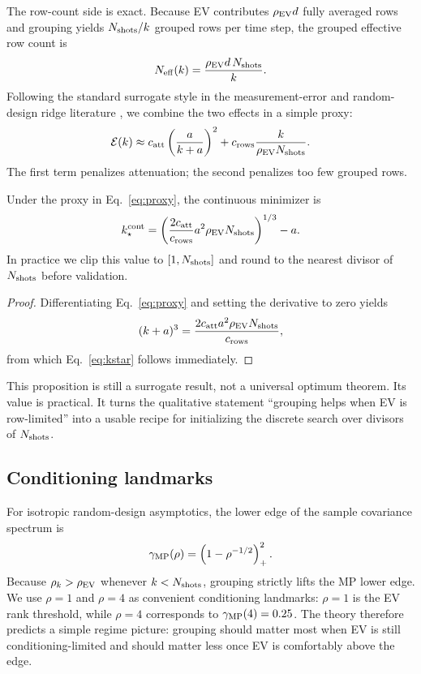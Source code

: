 The row-count side is exact. Because EV contributes $\rho_{\mathrm{EV}} d$ fully averaged rows and grouping yields $N_{\mathrm{shots}}/k$ grouped rows per time step, the grouped effective row count is
\begin{equation}
N_{\mathrm{eff}}(k)=\frac{\rho_{\mathrm{EV}} d\,N_{\mathrm{shots}}}{k}.
\label{eq:neff}
\end{equation}
Following the standard surrogate style in the measurement-error and random-design ridge literature \cite{hsu2012random,dobriban2018high}, we combine the two effects in a simple proxy:
\begin{equation}
\mathcal{E}(k) \approx c_{\mathrm{att}}\left(\frac{a}{k+a}\right)^2 + c_{\mathrm{rows}}\frac{k}{\rho_{\mathrm{EV}}N_{\mathrm{shots}}}.
\label{eq:proxy}
\end{equation}
The first term penalizes attenuation; the second penalizes too few grouped rows.

\begin{proposition}
Under the proxy in Eq.~\eqref{eq:proxy}, the continuous minimizer is
\begin{equation}
k_\star^{\mathrm{cont}} = \left(\frac{2c_{\mathrm{att}}}{c_{\mathrm{rows}}}a^2\rho_{\mathrm{EV}}N_{\mathrm{shots}}\right)^{1/3} - a.
\label{eq:kstar}
\end{equation}
In practice we clip this value to $[1,N_{\mathrm{shots}}]$ and round to the nearest divisor of $N_{\mathrm{shots}}$ before validation.
\end{proposition}

\begin{proof}
Differentiating Eq.~\eqref{eq:proxy} and setting the derivative to zero yields
\begin{equation}
(k+a)^3 = \frac{2c_{\mathrm{att}}a^2\rho_{\mathrm{EV}}N_{\mathrm{shots}}}{c_{\mathrm{rows}}},
\end{equation}
from which Eq.~\eqref{eq:kstar} follows immediately.
\end{proof}

This proposition is still a surrogate result, not a universal optimum theorem. Its value is practical. It turns the qualitative statement ``grouping helps when EV is row-limited'' into a usable recipe for initializing the discrete search over divisors of $N_{\mathrm{shots}}$.

\subsection{Conditioning landmarks}

For isotropic random-design asymptotics, the lower edge of the sample covariance spectrum is
\begin{equation}
\gamma_{\mathrm{MP}}(\rho)=\left(1-\rho^{-1/2}\right)_+^2.
\label{eq:mp}
\end{equation}
Because $\rho_k>\rho_{\mathrm{EV}}$ whenever $k<N_{\mathrm{shots}}$, grouping strictly lifts the MP lower edge. We use $\rho=1$ and $\rho=4$ as convenient conditioning landmarks: $\rho=1$ is the EV rank threshold, while $\rho=4$ corresponds to $\gamma_{\mathrm{MP}}(4)=0.25$. The theory therefore predicts a simple regime picture: grouping should matter most when EV is still conditioning-limited and should matter less once EV is comfortably above the edge.


